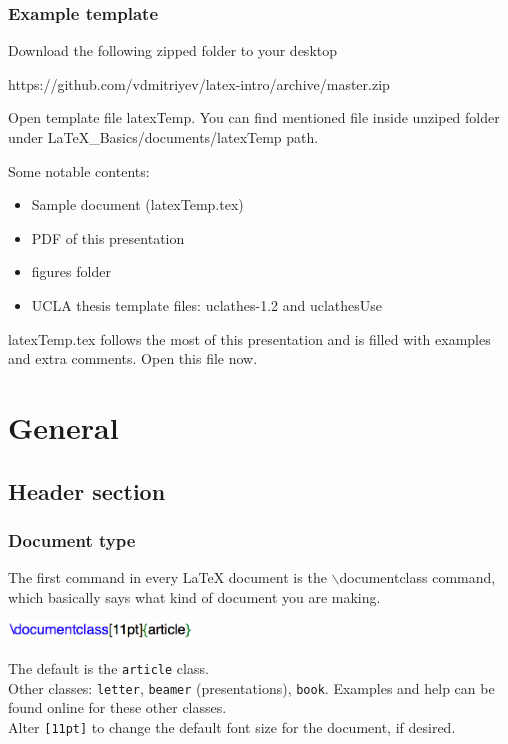 \documentclass[slidestop,compress,mathserif]{beamer}
\begin{document}
\begin{frame} \frametitle{Example template}
	
Download the following zipped folder to your desktop
\begin{center}
	{\color{highlight} https://github.com/vdmitriyev/latex-intro/archive/master.zip}
\end{center}

Open template file {\color{highlight}latexTemp}. You can find mentioned file inside unziped folder under {LaTeX\_Basics/documents/latexTemp} path. 

\vspace{0.2cm}

Some notable contents:
\begin{itemize}
	\item Sample document ({\color{highlight}latexTemp.tex})
	\item PDF of this presentation
	\item {\color{highlight}figures} folder
	\item UCLA thesis template files: {\color{highlight}uclathes-1.2} and {\color{highlight}uclathesUse}
\end{itemize}

{\color{highlight}latexTemp.tex} follows the most of this presentation and is filled with examples and extra comments. Open this file now.

\end{frame}



\section[General]{General}

\subsection[Header section]{Header section}
\begin{frame} \frametitle{Document type}
The first command in every LaTeX document is the {\color{command}$\backslash$documentclass} command, which basically says what kind of document you are making.
\begin{center}
\includegraphics[height=0.2in]{basicsOfLatex/general/documentClass}
\end{center}
The default is the \texttt{\color{highlight}article} class.
\vspace{5mm}\\
Other classes: \texttt{\color{highlight}letter}, \texttt{\color{highlight}beamer} (presentations), \texttt{\color{highlight}book}. Examples and help can be found online for these other classes.
\vspace{5mm} \\
Alter \texttt{\color{highlight}[11pt]} to change the default font size for the document, if desired.
\end{frame}
\end{document}
